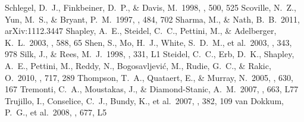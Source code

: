 \documentclass[apj]{emulateapj}
\begin{document}
\begin{thebibliography}{}
 Schlegel, D.~J., Finkbeiner,
  D.~P., \& Davis, M.\ 1998, \apj, 500, 525
 Scoville, N.~Z., Yun, M.~S., \&
  Bryant, P.~M.\ 1997, \apj, 484, 702
 Sharma, M., \& Nath,
  B.~B.\ 2011, arXiv:1112.3447
 Shapley, A.~E., Steidel, C.~C.,
  Pettini, M., \& Adelberger, K.~L.\ 2003, \apj, 588, 65
 Shen, S., Mo, H.~J., White,
  S.~D.~M., et al.\ 2003, \mnras, 343, 978
 Silk, J., \& Rees, M.~J.\ 1998,
  \aap, 331, L1
 Steidel, C.~C., Erb, D.~K.,
  Shapley, A.~E., Pettini, M., Reddy, N., Bogosavljevi{\'c}, M.,
  Rudie, G.~C., \& Rakic, O.\ 2010, \apj, 717, 289
 Thompson, T.~A., Quataert, E.,
  \& Murray, N.\ 2005, \apj, 630, 167
 Tremonti, C.~A., Moustakas, J.,
  \& Diamond-Stanic, A.~M.\ 2007, \apjl, 663, L77
 Trujillo, I., Conselice, C.~J.,
  Bundy, K., et al.\ 2007, \mnras, 382, 109
 van Dokkum, P.~G., et
  al.\ 2008, \apjl, 677, L5

\end{thebibliography}
\end{document}
